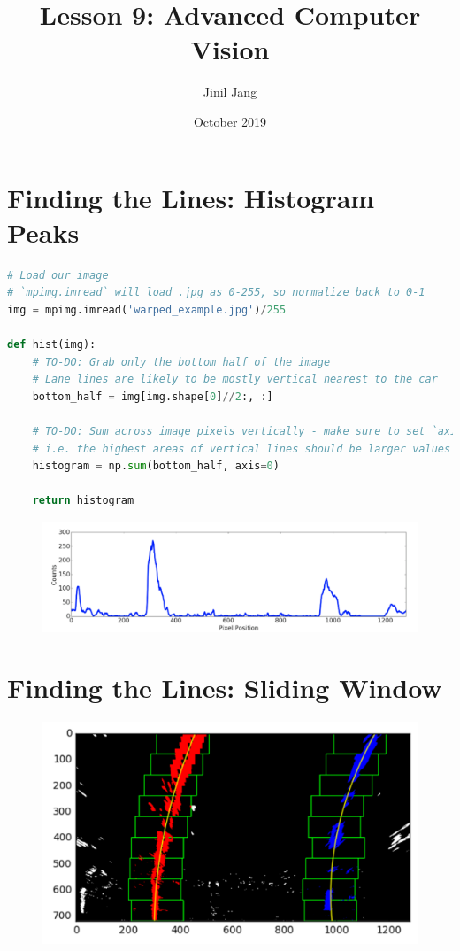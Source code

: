 \documentclass[12pt]{article}
\title{Lesson 9: Advanced Computer Vision}
\author{Jinil Jang }
\date{October 2019}
\begin{document}
\maketitle

\section{Finding the Lines: Histogram Peaks}

\begin{lstlisting}[language=Python]
# Load our image
# `mpimg.imread` will load .jpg as 0-255, so normalize back to 0-1
img = mpimg.imread('warped_example.jpg')/255

def hist(img):
    # TO-DO: Grab only the bottom half of the image
    # Lane lines are likely to be mostly vertical nearest to the car
    bottom_half = img[img.shape[0]//2:, :]

    # TO-DO: Sum across image pixels vertically - make sure to set `axis`
    # i.e. the highest areas of vertical lines should be larger values
    histogram = np.sum(bottom_half, axis=0)
    
    return histogram
\end{lstlisting}

\begin{figure}[htp]
    \centering
    \includegraphics[width=15cm]{histogram_peaks.png}
    \label{fig:histogram_peaks}
\end{figure}

\section{Finding the Lines: Sliding Window}

\begin{figure}[htp]
    \centering
    \includegraphics[width=15cm]{sliding_window.png}
    \label{fig:sliding_window}
\end{figure}
\end{document}
